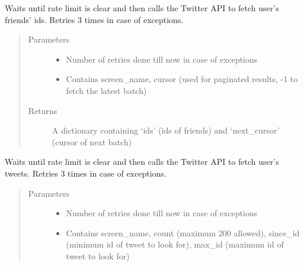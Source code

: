 \documentclass[letterpaper,10pt,english]{sphinxmanual}
\begin{document}
\begin{fulllineitems}
\begin{fulllineitems}
\label{\detokenize{twitter_stream:userstimeline.UserTimelineAPI.my_friends_fetcher}}
Waits until rate limit is clear and then calls the Twitter API to fetch user’s friends’ ids.
Retries 3 times in case of exceptions.
\begin{quote}\begin{description}
\item[{Parameters}] \leavevmode\begin{itemize}
\item {} 
 \textendash{} Number of retries done till now in case of exceptions

\item {} 
 \textendash{} Contains screen\_name, cursor (used for paginated results, -1 to fetch the latest batch)

\end{itemize}

\item[{Returns}] \leavevmode
A dictionary containing ‘ids’ (ids of friends) and ‘next\_cursor’ (cursor of next batch)

\end{description}\end{quote}

\end{fulllineitems}


\begin{fulllineitems}
\label{\detokenize{twitter_stream:userstimeline.UserTimelineAPI.my_tweet_fetcher}}
Waits until rate limit is clear and then calls the Twitter API to fetch user’s tweets.
Retries 3 times in case of exceptions.
\begin{quote}\begin{description}
\item[{Parameters}] \leavevmode\begin{itemize}
\item {} 
 \textendash{} Number of retries done till now in case of exceptions

\item {} 
 \textendash{} Contains screen\_name, count (maximum 200 allowed), since\_id (minimum id of tweet to look for), max\_id (maximum id of tweet to look for)


\end{itemize}
\end{description}
\end{quote}
\end{fulllineitems}
\end{fulllineitems}
\end{document}
